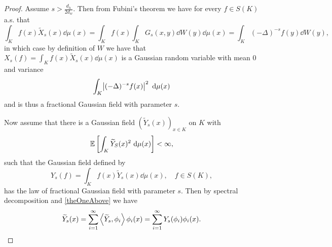 \begin{proof}
	Assume $s > \frac{d_h}{2d_w}$. Then from Fubini's theorem we have for every $f \in S(K)$ a.s. that 
	\begin{equation}
		\int_{K}f(x)\widetilde{X}_{s}(x) \dd \mu(x) =\int_{K}f(x) \int_{K} G_s(x,y) \dd W(y) \dd \mu(x) = \int_{K}(-\Delta)^{-s} f(y) \dd W(y),
	\end{equation}
	in which case by definition of $W$ we have that $X_s(f) = \int_{K}f(x)\widetilde{X}_{s}(x) \dd \mu(x)$ is a Gaussian random variable with mean 0 and variance
	\begin{equation}
		\int_{K}\abs{(-\Delta)^{-s}f(x)}^{2}\ \text{d} \mu(x)
	\end{equation}
	and is thus a fractional Gaussian field with parameter $s$. 
	
	\medskip
	Now assume that there is a Gaussian field $\left(\widetilde{Y}_{s}(x)\right)_{x \in K}$ on $K$ with
	\begin{equation}
		\mathbb{E} \left[\int_{K}\widetilde{Y}_S(x)^2 \ \text{d} \mu(x)\right] < \infty,
	\end{equation}
	such that the Gaussian field defined by
	\begin{equation}\label{theOneAbove}
		Y_s(f) = \int_{K}f(x) \widetilde{Y}_{s}(x) \dd \mu (x), \quad f \in S(K),
	\end{equation}
	has the law of fractional Gaussian field with parameter $s$. Then by spectral decomposition and \eqref{theOneAbove} we have
	\begin{equation}
		\widetilde{Y}_s(x) = \sum_{i= 1}^{\infty} \inn{\widetilde{Y}_{s}}{\phi_i} \phi_i(x) = \sum_{i = 1}^{\infty} Y_s(\phi_i)\phi_i(x).
	\end{equation}
	

\end{proof}

